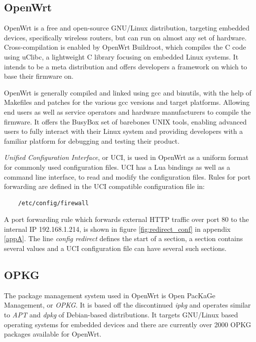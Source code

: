 \documentclass[a4paper,11pt]{kth-bcs}
\begin{document}
\subsection{OpenWrt}
OpenWrt is a free and open-source GNU/Linux distribution, targeting embedded devices, specifically wireless routers, but can run on almost any set of hardware.
Cross-compilation is enabled by OpenWrt Buildroot, which compiles the C code using uClibc, a lightweight C library focusing on embedded Linux systems. 
It intends to be a meta distribution and offers developers a framework on which to base their firmware on.

OpenWrt is generally compiled and linked using gcc and binutils, with the help of Makefiles and patches for the various gcc versions and target platforms.
Allowing end users as well as service operators and hardware manufacturers to compile the firmware.
It offers the BusyBox set of barebones UNIX tools, enabling advanced users to fully interact with their Linux system and providing developers with a familiar platform for debugging and testing their product.
\cite{OpenWrt:structure_design}

\emph{Unified Configuration Interface}, or UCI, is used in OpenWrt as a uniform format for commonly used configuration files.
UCI has a Lua bindings as well as a command line interface, to read and modify the configuration files.
Rules for port forwarding are defined in the UCI compatible configuration file in:
\begin{verbatim}
    /etc/config/firewall
\end{verbatim}

A port forwarding rule which forwards external HTTP traffic over port 80 to the internal IP 192.168.1.214, is shown in figure \ref{fig:redirect_conf} in appendix \ref{appA}.
The line \emph{config redirect} defines the start of a section, a section contains several values and a UCI configuration file can have several such sections.

\subsection{OPKG}
The package management system used in OpenWrt is Open PacKaGe Management, or \emph{OPKG}. It is based off the discontinued \emph{ipkg} and operates similar to \emph{APT} and \emph{dpkg} of Debian-based distributions.
It targets GNU/Linux based operating systems for embedded devices and there are currently over 2000 OPKG packages available for OpenWrt.
\end{document}
